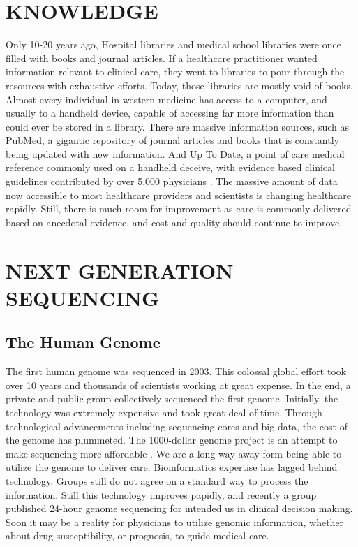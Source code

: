 \documentclass[sigconf]{acmart}
\begin{document}
\section{KNOWLEDGE}

Only 10-20 years ago, Hospital libraries and medical school libraries
were once filled with books and journal articles.  If a healthcare
practitioner wanted information relevant to clinical care, they went
to libraries to pour through the resources with exhaustive efforts.
Today, those libraries are mostly void of books.  Almost every
individual in western medicine has access to a computer, and usually
to a handheld device, capable of accessing far more information than
could ever be stored in a library.  There are massive information
sources, such as PubMed, a gigantic repository of journal articles and
books that is constantly being updated with new information.  And Up
To Date, a point of care medical reference commonly used on a handheld
deceive, with evidence based clinical guidelines contributed by over
5,000 physicians \cite{wiki-uptodate}. The massive amount of data now
accessible to most healthcare providers and scientists is changing
healthcare rapidly.  Still, there is much room for improvement as care
is commonly delivered based on anecdotal evidence, and cost and
quality should continue to improve.

\section{NEXT GENERATION SEQUENCING}

\subsection{	The Human Genome}

The first human genome was sequenced in 2003\cite{collins2003human}.  This colossal global
effort took over 10 years and thousands of scientists working at great
expense.  In the end, a private and public group collectively
sequenced the first genome.  Initially, the technology was extremely
expensive and took great deal of time.  Through technological
advancements including sequencing cores and big data, the cost of the
genome has plummeted.  The 1000-dollar genome project is an attempt to
make sequencing more affordable \cite{fox6}.  We are a long way away form
being able to utilize the genome to deliver care.  Bioinformatics
expertise has lagged behind technology.  Groups still do not agree on
a standard way to process the information.  Still this technology
improves papidly, and recently a group published 24-hour genome
sequencing for intended us in clinical decision making. Soon it may be
a reality for physicians to utilize genomic information, whether about
drug susceptibility, or prognosis, to guide medical care.
\end{document}
